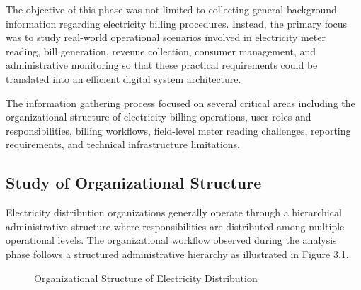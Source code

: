 \documentclass[12pt, a4paper, onecolumn]{report}
\begin{document}
The objective of this phase was not limited to collecting general background information regarding electricity billing procedures. Instead, the primary focus was to study real-world operational scenarios involved in electricity meter reading, bill generation, revenue collection, consumer management, and administrative monitoring so that these practical requirements could be translated into an efficient digital system architecture.

The information gathering process focused on several critical areas including the organizational structure of electricity billing operations, user roles and responsibilities, billing workflows, field-level meter reading challenges, reporting requirements, and technical infrastructure limitations.

\subsection{Study of Organizational Structure}
Electricity distribution organizations generally operate through a hierarchical administrative structure where responsibilities are distributed among multiple operational levels. The organizational workflow observed during the analysis phase follows a structured administrative hierarchy as illustrated in Figure 3.1.

\begin{figure}[htbp]
    \centering
    \caption{Organizational Structure of Electricity Distribution}
\end{figure}
\end{document}
